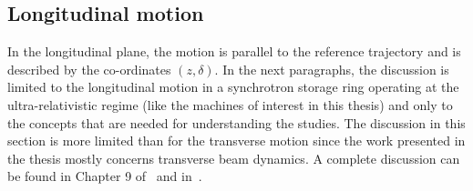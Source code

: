 





\subsection{Longitudinal motion}\label{subsec:longitudinal_motion}
In the longitudinal plane, the motion is parallel to the reference trajectory and is described by the co-ordinates $(z, \delta)$. In the next paragraphs, the discussion is limited to the longitudinal motion in a synchrotron storage ring operating at the ultra-relativistic regime (like the machines of interest in this thesis) and only to the concepts that are needed for understanding the studies. The discussion in this section is more limited than for the transverse motion since the work presented in the thesis mostly concerns transverse beam dynamics. A complete discussion can be found in Chapter 9 of~\cite{Wiedemann:1083415} and in~\cite{wolski2014}.

